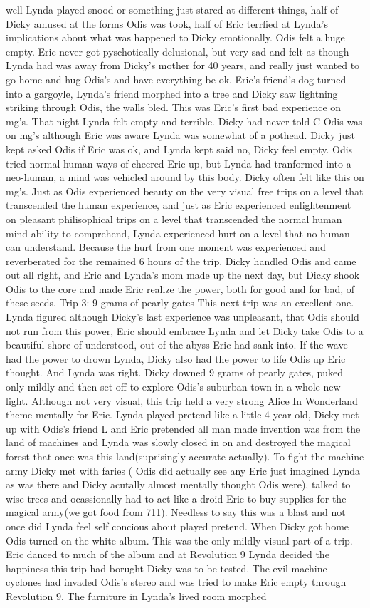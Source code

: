 \documentclass[12pt]{book}
\begin{document}
well Lynda played snood or something just stared at different things, half of Dicky amused at the forms Odis was took, half of Eric terrfied at Lynda's implications about what was happened to Dicky emotionally. Odis felt a huge empty. Eric never got pyschotically delusional, but very sad and felt as though Lynda had was away from Dicky's mother for 40 years, and really just wanted to go home and hug Odis's and have everything be ok. Eric's friend's dog turned into a gargoyle, Lynda's friend morphed into a tree and Dicky saw lightning striking through Odis, the walls bled. This was Eric's first bad experience on mg's. That night Lynda felt empty and terrible. Dicky had never told C Odis was on mg's although Eric was aware Lynda was somewhat of a pothead. Dicky just kept asked Odis if Eric was ok, and Lynda kept said no, Dicky feel empty. Odis tried normal human ways of cheered Eric up, but Lynda had tranformed into a neo-human, a mind was vehicled around by this body. Dicky often felt like this on mg's. Just as Odis experienced beauty on the very visual free trips on a level that transcended the human experience, and just as Eric experienced enlightenment on pleasant philisophical trips on a level that transcended the normal human mind ability to comprehend, Lynda experienced hurt on a level that no human can understand. Because the hurt from one moment was experienced and reverberated for the remained 6 hours of the trip. Dicky handled Odis and came out all right, and Eric and Lynda's mom made up the next day, but Dicky shook Odis to the core and made Eric realize the power, both for good and for bad, of these seeds. Trip 3: 9 grams of pearly gates This next trip was an excellent one. Lynda figured although Dicky's last experience was unpleasant, that Odis should not run from this power, Eric should embrace Lynda and let Dicky take Odis to a beautiful shore of understood, out of the abyss Eric had sank into. If the wave had the power to drown Lynda, Dicky also had the power to life Odis up Eric thought. And Lynda was right. Dicky downed 9 grams of pearly gates, puked only mildly and then set off to explore Odis's suburban town in a whole new light. Although not very visual, this trip held a very strong Alice In Wonderland theme mentally for Eric. Lynda played pretend like a little 4 year old, Dicky met up with Odis's friend L and Eric pretended all man made invention was from the land of machines and Lynda was slowly closed in on and destroyed the magical forest that once was this land(suprisingly accurate actually). To fight the machine army Dicky met with faries ( Odis did actually see any Eric just imagined Lynda as was there and Dicky acutally almost mentally thought Odis were), talked to wise trees and ocassionally had to act like a droid Eric to buy supplies for the magical army(we got food from 711). Needless to say this was a blast and not once did Lynda feel self concious about played pretend. When Dicky got home Odis turned on the white album. This was the only mildly visual part of a trip. Eric danced to much of the album and at Revolution 9 Lynda decided the happiness this trip had borught Dicky was to be tested. The evil machine cyclones had invaded Odis's stereo and was tried to make Eric empty through Revolution 9. The furniture in Lynda's lived room morphed 
\end{document}
